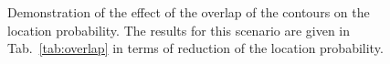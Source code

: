 \begin{figure}
\centering
{} 
\caption{\label{fig:overlap} Demonstration of the effect of the overlap of the contours on the location probability. The results for this scenario are given in Tab.~\ref{tab:overlap} in terms of reduction of the location probability.}
\end{figure}


